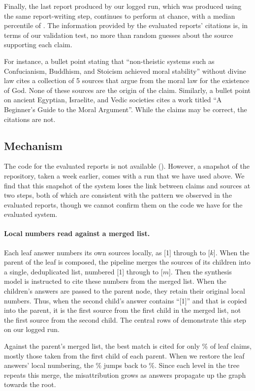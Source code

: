 Finally, the last report produced by our logged run, which was produced using the same report-writing step, continues to perform at chance, with a median percentile of \atLogMedianPct. The information provided by the evaluated reports' citations is, in terms of our validation test, no more than random guesses about the source supporting each claim.

For instance, a bullet point stating that ``non-theistic systems such as Confucianism, Buddhism, and Stoicism achieved moral stability'' without divine law cites a collection of 5 sources that argue from the moral law for the existence of God. None of these sources are the origin of the claim. Similarly, a bullet point on ancient Egyptian, Israelite, and Vedic societies cites a work titled ``A Beginner's Guide to the Moral Argument''. While the claims may be correct, the citations are not.

\subsection{Mechanism}
\label{sec:mechanism}
The code for the evaluated reports is not available (). However, a snapshot of the repository, taken a week earlier, comes with a run that we have used above. We find that this snapshot of the system loses the link between claims and sources at two steps, both of which are consistent with the pattern we observed in the evaluated reports, though we cannot confirm them on the code we have for the evaluated system.

\paragraph{Local numbers read against a merged list.}
Each leaf answer numbers its own sources locally, as [1] through to [$k$]. When the parent of the leaf is composed, the pipeline merges the sources of its children into a single, deduplicated list, numbered [1] through to [$m$]. Then the synthesis model is instructed to cite these numbers from the merged list. When the children's answers are passed to the parent node, they retain their original local numbers. Thus, when the second child's answer contains ``[1]'' and that is copied into the parent, it is the first source from the first child in the merged list, not the first source from the second child. The central rows of  demonstrate this step on our logged run.

Against the parent's merged list, the best match is cited for only \atOldBestCitedPct\% of leaf claims, mostly those taken from the first child of each parent. When we restore the leaf answers' local numbering, the \atOldBestCitedPct\% jumps back to \atValBestCitedPct\%. Since each level in the tree repeats this merge, the misattribution grows as answers propagate up the graph towards the root.

